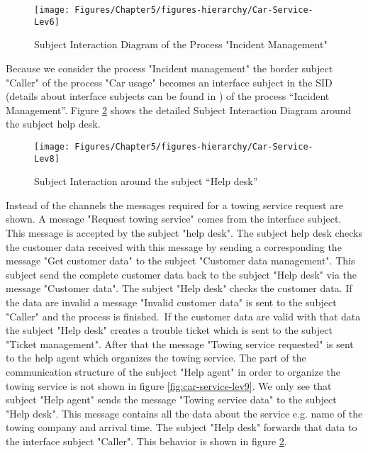 \begin{figure}[htbp]
	\centering
	\texttt{[image: Figures/Chapter5/figures-hierarchy/Car-Service-Lev6]}
	\caption[Subject Interaction Diagram of the Process "Incident Management"]{Subject Interaction Diagram of the Process "Incident Management"}
	\label{fig:car-service-lev6}
\end{figure}

Because we consider the process "Incident management" the border subject "Caller" of the process "Car usage" becomes an interface subject in the SID (details about interface subjects can be found in \cite{Flei12}) of the process “Incident Management”. Figure \ref{fig:car-service-lev8} shows the detailed Subject Interaction Diagram around the subject help desk. \\

\begin{figure}[htbp]
	\centering
	\texttt{[image: Figures/Chapter5/figures-hierarchy/Car-Service-Lev8]}
	\caption[Subject Interaction around the subject “Help desk”]{Subject Interaction around the subject “Help desk”}
	\label{fig:car-service-lev8}
\end{figure}

Instead of the channels the messages required for a towing service request are shown. A message "Request towing service" comes from the interface subject. This message is accepted by the subject "help desk". The subject help desk checks the customer data received with this message by sending a corresponding the message "Get customer data" to the subject "Customer data management". This subject send the complete customer data back to the subject "Help desk" via the message "Customer data". The subject "Help desk" checks the customer data. If the data are invalid a message "Invalid customer data" is sent to the subject "Caller" and the process is finished.\
If the customer data are valid with that data the subject "Help desk" creates a trouble ticket which is sent to the subject "Ticket management". After that the message "Towing service requested" is sent to the help agent which organizes the towing service. The part of the communication structure of the subject "Help agent" in order to organize the towing service is not shown in figure \ref{fig:car-service-lev9}. We only see that subject "Help agent" sends the message "Towing service data" to the subject "Help desk". This message contains all the data about the service e.g. name of the towing company and arrival time. The subject "Help desk" forwards that data to the interface subject "Caller". This behavior is shown in figure \ref{fig:car-service-lev8}.\\



